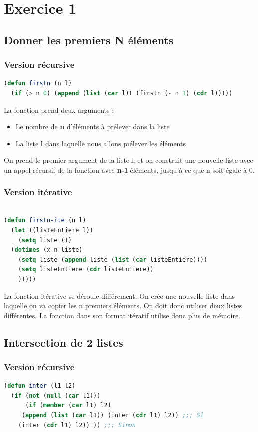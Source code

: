 \documentclass[a4paper,10pt]{report}
\begin{document}
\chapter{Exercice 1}
  \section{Donner les premiers N éléments}
  \subsection{Version récursive}
  \begin{lstlisting}[language=Lisp]
    (defun firstn (n l)
  (if (> n 0) (append (list (car l)) (firstn (- n 1) (cdr l)))))
  \end{lstlisting}

  La fonction prend deux arguments :
  \begin{itemize}
   \item Le nombre de \textbf{n} d'éléments à prélever dans la liste
   \item La liste \textbf{l} dans laquelle nous allons prélever les éléments
  \end{itemize}
  On prend le premier argument de la liste l, et on construit une nouvelle liste avec un appel récursif de la fonction avec \textbf{n-1} éléments, jusqu'à ce que n soit égale à 0. \newline
    \subsection{Version itérative}
  \begin{lstlisting}[language=Lisp]
    
(defun firstn-ite (n l)
  (let ((listeEntiere l))
    (setq liste ())
  (dotimes (x n liste)
    (setq liste (append liste (list (car listeEntiere))))
    (setq listeEntiere (cdr listeEntiere))
    )))))
  \end{lstlisting}
  
  La fonction itérative se déroule différement. On crée une nouvelle liste dans laquelle on va copier les n premiers éléments. On doit donc utiliser deux listes différentes. La fonction dans son format itératif utilise donc plus de mémoire.
    \newpage
    \section{Intersection de 2 listes}
      \subsection{Version récursive}
	\begin{lstlisting}[language=Lisp]
(defun inter (l1 l2)
  (if (not (null (car l1)))
      (if (member (car l1) l2)
	 (append (list (car l1)) (inter (cdr l1) l2)) ;;; Si
	(inter (cdr l1) l2)) )) ;;; Sinon
	
	
	\end{lstlisting}
\end{document}
